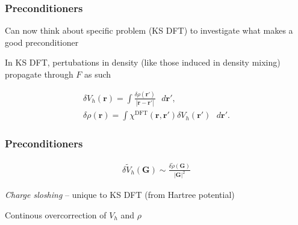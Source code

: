 \documentclass{beamer}
\begin{document}
\begin{frame}

\frametitle{Preconditioners}

Can now think about specific problem (KS DFT) to investigate what makes a good preconditioner

\vspace{0.6cm}

In KS DFT, pertubations in density (like those induced in density mixing) propagate through $F$ as such

\vspace{0.3cm}

\begin{gather}
\delta V_h(\textbf{r}) = \int \frac{\delta \rho(\textbf{r}')}{|\textbf{r} - \textbf{r}'|} \text{ } d\textbf{r}', \label{slosh1} \nonumber \\
\delta \rho(\textbf{r}) = \int \chi^{\text{DFT}} (\textbf{r},\textbf{r}') \delta V_h(\textbf{r}') \text{ } d\textbf{r}'. \label{slosh2} \nonumber
\end{gather}

\vspace{0.6cm}


\vspace{0.6cm}


\end{frame}



\begin{frame}

\frametitle{Preconditioners}

\begin{gather}
\delta \tilde{V}_h(\textbf{G}) \sim \frac{\delta \tilde{\rho}(\textbf{G})}{|\textbf{G}|^2} \nonumber
\end{gather}

\vspace{0.6cm}

\textit{Charge sloshing} -- unique to KS DFT (from Hartree potential)

\vspace{0.3cm}

Continous overcorrection of $V_h$ and $\rho$

\vspace{0.6cm}


\vspace{0.6cm}


\end{frame}
\end{document}
